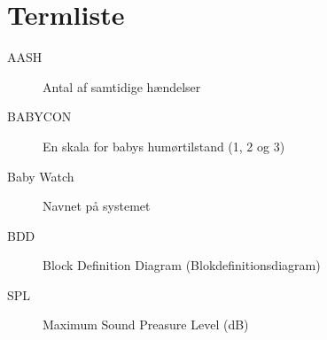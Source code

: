 \chapter{Termliste}


\begin{description}

\item[AASH] Antal af samtidige hændelser
\item[BABYCON] En skala for babys humørtilstand (1, 2 og 3)
\item[Baby Watch] Navnet på systemet
\item[BDD] Block Definition Diagram (Blokdefinitionsdiagram)
\item[SPL] Maximum Sound Preasure Level (dB)

\end{description}